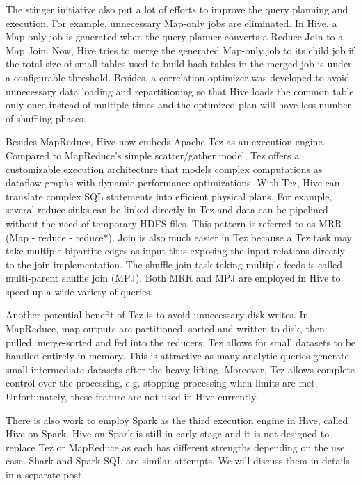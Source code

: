 \documentclass[11pt]{book}
\begin{document}
The stinger initiative also put a lot of efforts to improve the query planning and execution. For example, unnecessary Map-only jobs are eliminated. In Hive, a Map-only job is generated when the query planner converts a Reduce Join to a Map Join. Now, Hive tries to merge the generated Map-only job to its child job if the total size of small tables used to build hash tables in the merged job is under a configurable threshold. Besides, a correlation optimizer was developed to avoid unnecessary data loading and repartitioning so that Hive loads the common table only once instead of multiple times and the optimized plan will have less number of shuffling phases.

Besides MapReduce, Hive now embeds Apache Tez as an execution engine. Compared to MapReduce's simple scatter/gather model, Tez offers a customizable execution architecture that models complex computations as dataflow graphs with dynamic performance optimizations. With Tez, Hive can translate complex SQL statements into efficient physical plans. For example, several reduce sinks can be linked directly in Tez and data can be pipelined without the need of temporary HDFS files. This pattern is referred to as MRR (Map - reduce - reduce*). Join is also much easier in Tez because a Tez task may take multiple bipartite edges as input thus exposing the input relations directly to the join implementation. The shuffle join task taking multiple feeds is called multi-parent shuffle join (MPJ). Both MRR and MPJ are employed in Hive to speed up a wide variety of queries.

Another potential benefit of Tez is to avoid unnecessary disk writes. In MapReduce, map outputs are partitioned, sorted and written to disk, then pulled, merge-sorted and fed into the reducers. Tez allows for small datasets to be handled entirely in memory. This is attractive as many analytic queries generate small intermediate datasets after the heavy lifting. Moreover, Tez allows complete control over the processing, e.g. stopping processing when limits are met. Unfortunately, these feature are not used in Hive currently.

There is also work to employ Spark as the third execution engine in Hive, called Hive on Spark. Hive on Spark is still in early stage and it is not designed to replace Tez or MapReduce as each has different strengths depending on the use case. Shark and Spark SQL are similar attempts. We will discuss them in details in a separate post.
\end{document}
